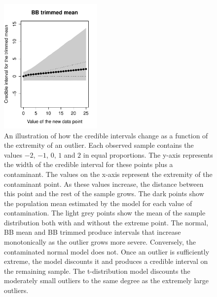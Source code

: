 \documentclass[doc]{apa6}
\begin{document}
{\begin{figure}[p]
    \includegraphics[width=5.0cm]{CI_bbtm.pdf}
    \caption{An illustration of how the credible intervals change as a function of the extremity of an outlier. Each observed sample contains the values $-2$, $-1$, $0$, $1$ and $2$ in equal proportions. The y-axis represents the width of the credible interval for these points plus a contaminant. The values on the x-axis represent the extremity of the contaminant point. As these values increase, the distance between this point and the rest of the sample grows.   The dark points show the population mean estimated by the model for each value of contamination. The light grey points show the mean of the sample distribution both with and without the extreme point.   The normal, BB mean and BB trimmed produce intervals that increase monotonically as the outlier grows more severe. Conversely, the contaminated normal model does not. Once an outlier is sufficiently extreme, the model discounts it and produces a credible interval on the remaining sample.   The t-distribution model discounts the moderately small outliers to the same degree as the extremely large outliers.   }
    \label{toyproblem}
\end{figure}

}
\end{document}
